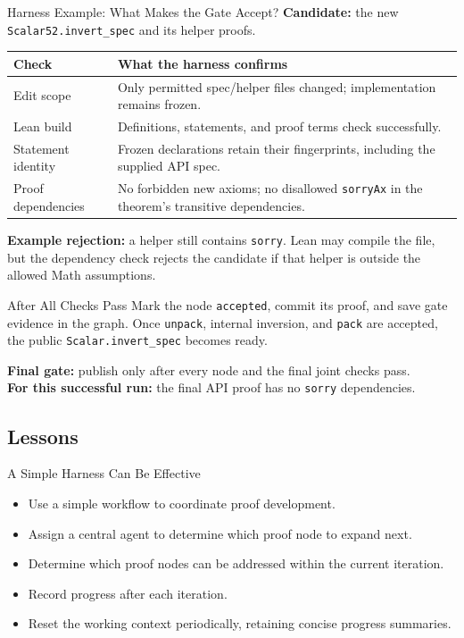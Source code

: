 \documentclass[aspectratio=169,xcolor=dvipsnames]{beamer}
\begin{document}
\begin{frame}{Harness Example: What Makes the Gate Accept?}
    \footnotesize
    \textbf{Candidate:} the new \texttt{Scalar52.invert\_spec} and its helper proofs.
    \begin{center}
    \begin{tabular}{@{}p{}p{}@{}}
        \toprule
        Check & What the harness confirms \\
        \midrule
        Edit scope & Only permitted spec/helper files changed; implementation remains frozen. \\[2pt]
        Lean build & Definitions, statements, and proof terms check successfully. \\[2pt]
        Statement identity & Frozen declarations retain their fingerprints, including the supplied API spec. \\[2pt]
        Proof dependencies & No forbidden new axioms; no disallowed \texttt{sorryAx} in the theorem's transitive dependencies. \\
        \bottomrule
    \end{tabular}
    \end{center}
    \textbf{Example rejection:} a helper still contains \texttt{sorry}. Lean may compile the file,
    but the dependency check rejects the candidate if that helper is outside the allowed Math assumptions.
    \begin{block}{After All Checks Pass}
        Mark the node \texttt{accepted}, commit its proof, and save gate evidence in the graph.
        Once \texttt{unpack}, internal inversion, and \texttt{pack} are accepted,
        the public \texttt{Scalar.invert\_spec} becomes ready.
    \end{block}
    \textbf{Final gate:} publish only after every node and the final joint checks pass.\\[2pt]
    \textbf{For this successful run:} the final API proof has no \texttt{sorry} dependencies.
\end{frame}

\subsection{Lessons}

\begin{frame}{A Simple Harness Can Be Effective}
    \begin{itemize}
        \item Use a simple workflow to coordinate proof development.
        \item Assign a central agent to determine which proof node to expand next.
        \item Determine which proof nodes can be addressed within the current iteration.
        \item Record progress after each iteration.
        \item Reset the working context periodically, retaining concise progress summaries.
    \end{itemize}

\end{frame}
\end{document}
